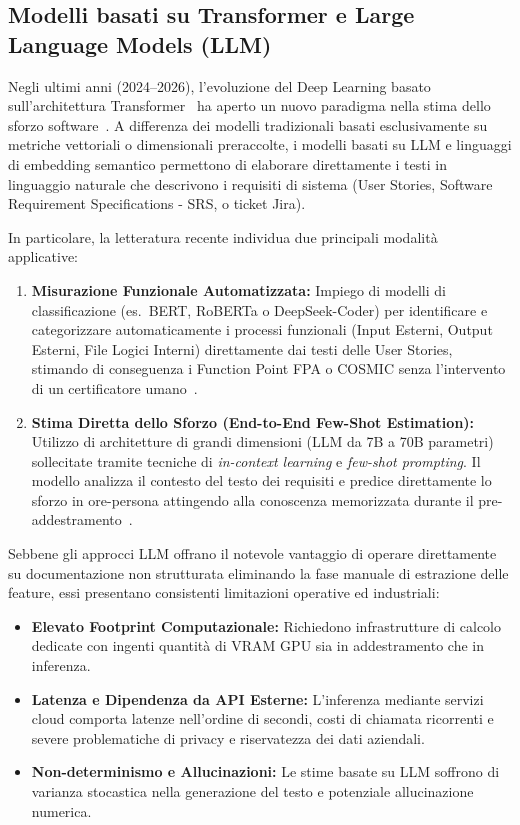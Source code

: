 \documentclass[11pt, a4paper]{article}
\begin{document}
\subsection{Modelli basati su Transformer e Large Language Models (LLM)}
Negli ultimi anni (2024--2026), l'evoluzione del Deep Learning basato sull'architettura Transformer~\cite{vaswani2017attention} ha aperto un nuovo paradigma nella stima dello sforzo software~\cite{llm_sdee_2025, transformer_sdee_2024}. A differenza dei modelli tradizionali basati esclusivamente su metriche vettoriali o dimensionali preraccolte, i modelli basati su LLM e linguaggi di embedding semantico permettono di elaborare direttamente i testi in linguaggio naturale che descrivono i requisiti di sistema (User Stories, Software Requirement Specifications - SRS, o ticket Jira).

In particolare, la letteratura recente individua due principali modalità applicative:
\begin{enumerate}
    \item \textbf{Misurazione Funzionale Automatizzata:} Impiego di modelli di classificazione (es.\ BERT, RoBERTa o DeepSeek-Coder) per identificare e categorizzare automaticamente i processi funzionali (Input Esterni, Output Esterni, File Logici Interni) direttamente dai testi delle User Stories, stimando di conseguenza i Function Point FPA o COSMIC senza l'intervento di un certificatore umano~\cite{llm_sdee_2025}.
    \item \textbf{Stima Diretta dello Sforzo (End-to-End Few-Shot Estimation):} Utilizzo di architetture di grandi dimensioni (LLM da 7B a 70B parametri) sollecitate tramite tecniche di \textit{in-context learning} e \textit{few-shot prompting}. Il modello analizza il contesto del testo dei requisiti e predice direttamente lo sforzo in ore-persona attingendo alla conoscenza memorizzata durante il pre-addestramento~\cite{transformer_sdee_2024}.
\end{enumerate}

Sebbene gli approcci LLM offrano il notevole vantaggio di operare direttamente su documentazione non strutturata eliminando la fase manuale di estrazione delle feature, essi presentano consistenti limitazioni operative ed industriali:
\begin{itemize}
    \item \textbf{Elevato Footprint Computazionale:} Richiedono infrastrutture di calcolo dedicate con ingenti quantità di VRAM GPU sia in addestramento che in inferenza.
    \item \textbf{Latenza e Dipendenza da API Esterne:} L'inferenza mediante servizi cloud comporta latenze nell'ordine di secondi, costi di chiamata ricorrenti e severe problematiche di privacy e riservatezza dei dati aziendali.
    \item \textbf{Non-determinismo e Allucinazioni:} Le stime basate su LLM soffrono di varianza stocastica nella generazione del testo e potenziale allucinazione numerica.
\end{itemize}
\end{document}
